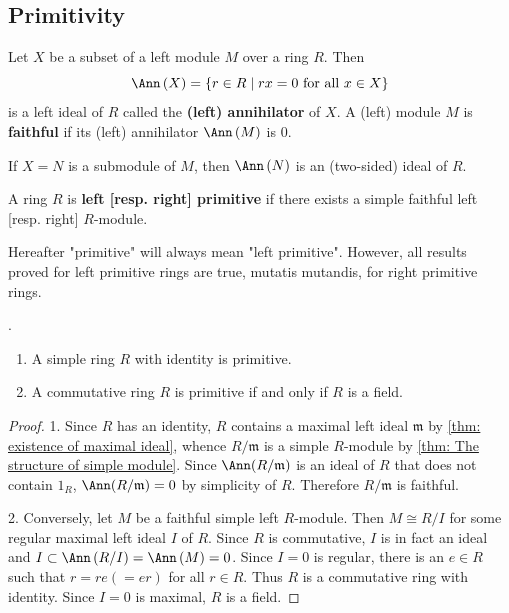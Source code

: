 \subsection{Primitivity} %

\begin{definition}
    Let $X$ be a subset of a left module $M$ over a ring $R$.
    Then
    \begin{equation*}
        \Ann\left(X\right)
        =
        \left\{r\in R \mid rx=0 \text{ for all } x \in X\right\}
    \end{equation*}
    is a left ideal of $R$ called the \textbf{(left) annihilator} of $X$.
    A (left) module $M$ is \textbf{faithful} if its (left) annihilator $\Ann\left(M\right)$ is $0$.
\end{definition}

\begin{proposition}
    If $X=N$ is a submodule of $M$, then $\Ann\left(N\right)$ is an (two-sided) ideal of $R$.
\end{proposition}


\begin{definition}
    A ring $R$ is \textbf{left [resp. right] primitive} if there exists a simple faithful left [resp. right] $R$-module.
\end{definition}

Hereafter "primitive" will always mean "left primitive".
However, all results proved for left primitive rings are true,
mutatis mutandis, for right primitive rings.


\begin{proposition}.
    \begin{enumerate}
        \item
              A simple ring $R$ with identity is primitive.

        \item
              A commutative ring $R$ is primitive if and only if $R$ is a field.
    \end{enumerate}

    \begin{proof}
        1.
        Since $R$ has an identity, $R$ contains a maximal left ideal $\mathfrak{m}$  by \ref{thm: existence of maximal ideal}, whence $R / \mathfrak{m}$ is a simple $R$-module by \ref{thm: The structure of simple module}.
        Since $\Ann(R / \mathfrak{m})$ is an ideal of $R$ that does not contain $1_R$, $\Ann(R / \mathfrak{m})=0$ by simplicity of $R$. Therefore $R /  \mathfrak{m}$ is faithful.

        2.
        Conversely, let $M$ be a faithful simple left $R$-module. Then $M \cong R / I$ for some regular maximal left ideal $I$ of $R$. Since $R$ is commutative, $I$ is in fact an ideal and $I \subset \Ann\left( R / I \right)=\Ann\left(M \right)=0$.
        Since $I=0$ is regular, there is an $e \in R$ such that $r=r e(=e r)$ for all $r \in R$.
        Thus $R$ is a commutative ring with identity. Since $I=0$ is maximal, $R$ is a field.
    \end{proof}
\end{proposition}

